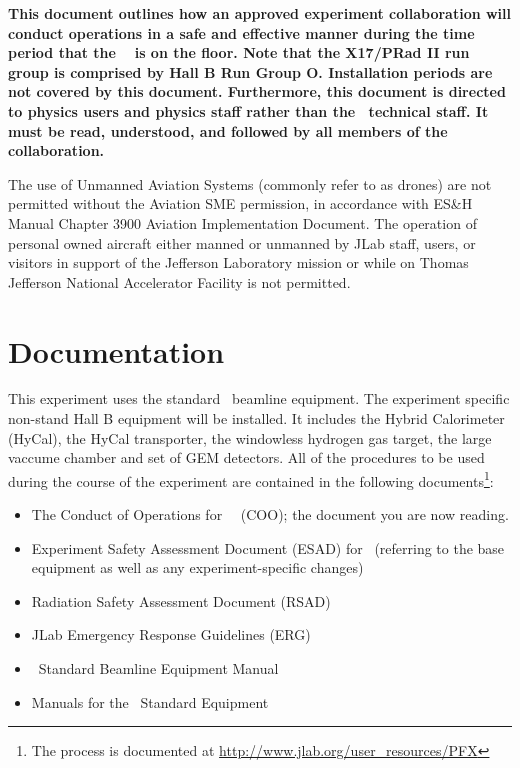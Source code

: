 \documentclass[11pt]{article}
\begin{document}
{\bf This document outlines how an approved experiment collaboration will conduct
operations in a safe and effective manner during the time period that the 
\EXPTS\  %
 is on the floor. Note that the X17/PRad II run group is comprised by Hall B
Run Group O. Installation 
periods are not covered by this document. 
Furthermore, this document is directed to physics users and
physics staff rather than the \HALL\ technical staff. It must be read, 
understood, and followed by all members of the collaboration. }

The use of Unmanned Aviation Systems (commonly refer to as drones) are not permitted without the Aviation SME permission, in accordance with ES\&H Manual Chapter 3900 Aviation Implementation Document. The operation of personal owned aircraft either manned or unmanned by JLab staff, users, or visitors in support of the Jefferson Laboratory mission or while on Thomas Jefferson National Accelerator Facility is not permitted.

\section{Documentation}
\indent

This experiment uses the standard \HALL\ beamline equipment. The experiment specific non-stand Hall B equipment will be installed. It includes the Hybrid Calorimeter (HyCal), the HyCal transporter, the windowless hydrogen gas target, the large vaccume chamber and set of GEM detectors.
All of the procedures to be used during the course of the experiment are contained in the following
documents\footnote{The process is documented at \url{http://www.jlab.org/user_resources/PFX} }:

\begin{itemize}

\item  The Conduct of Operations for \HALL\ \EXPTS\ 
 (COO); the document you are now reading. 

\item   Experiment Safety Assessment Document (ESAD)
for \EXPTS\ (referring to the base equipment as well as any 
experiment-specific changes)

\item Radiation Safety Assessment Document (RSAD) 

\item JLab Emergency Response Guidelines (ERG) 

\item \HALL\ Standard Beamline Equipment Manual 

\item Manuals for the \EXPTSabrev\ Standard Equipment 

\end{itemize}
\end{document}
